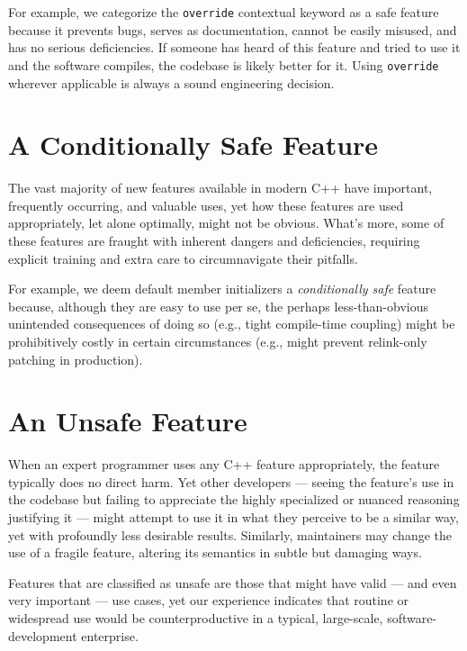 For example, we categorize the \lstinline!override! contextual keyword as a safe feature because it prevents bugs, serves as documentation, cannot be easily misused, and has no serious deficiencies. If someone has heard of this feature and tried to use it and the software compiles, the codebase is likely better for it. Using \lstinline!override! wherever applicable is always a sound engineering decision.

\section[A {\sffamily\itshape Conditionally Safe} Feature]{A {\sfbsectionitalRomeo Conditionally Safe} Feature}

The vast majority of new features available in modern C++ have important, frequently occurring, and valuable uses, yet how these features are used appropriately, let alone optimally, might not be obvious. What’s more, some of these features are fraught with inherent dangers and deficiencies, requiring explicit training and extra care to circumnavigate their pitfalls.

For example, we deem default member initializers a \emph{conditionally safe} feature because, although they are easy to use per se, the perhaps less-than-obvious unintended consequences of doing so (e.g., tight compile-time coupling) might be prohibitively costly in certain circumstances (e.g., might prevent relink-only patching in production).

\section[An {\sffamily\itshape Unsafe} Feature]{An {\sfbsectionitalRomeo Unsafe} Feature}

When an expert programmer uses any C++ feature appropriately, the feature typically does no direct harm. Yet other developers --- seeing the feature’s use in the codebase but failing to appreciate the highly specialized or nuanced reasoning justifying it --- might attempt to use it in what they perceive to be a similar way, yet with profoundly less desirable results. Similarly, maintainers may change the use of a fragile feature, altering its semantics in subtle but damaging ways.

Features that are classified as unsafe are those that might have valid --- and even very important --- use cases, yet our experience indicates that routine or widespread use would be counterproductive in a typical, large-scale, software-development enterprise.

